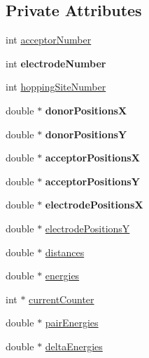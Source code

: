 \subsection*{Private Attributes}
\begin{DoxyCompactItemize}
\item 
int \hyperlink{classSystem_a1537030f9695aa1ec4184cd5669c73c3}{acceptor\+Number}
\item 
\mbox{\label{classSystem_a12c3b3c11046ab5d78b8805b72fae470}} 
int {\bfseries electrode\+Number}
\item 
int \hyperlink{classSystem_abace9493421abf20f1ae9502963a9b5d}{hopping\+Site\+Number}
\item 
\mbox{\label{classSystem_aa8a48bb1ca893cd2835daf8c0c9ecb31}} 
double $\ast$ {\bfseries donor\+PositionsX}
\item 
\mbox{\label{classSystem_ab4c8bb2714bac75e32ed8c96110059db}} 
double $\ast$ {\bfseries donor\+PositionsY}
\item 
\mbox{\label{classSystem_a36edfe2e62188f33cd8a5176e86da7ee}} 
double $\ast$ {\bfseries acceptor\+PositionsX}
\item 
\mbox{\label{classSystem_af1f617f7f8675673bbc672dd14738882}} 
double $\ast$ {\bfseries acceptor\+PositionsY}
\item 
\mbox{\label{classSystem_a15808f18033c796219fe010534d8e8df}} 
double $\ast$ {\bfseries electrode\+PositionsX}
\item 
double $\ast$ \hyperlink{classSystem_a19886677a5c1f1989fee3a9d1d4b4c80}{electrode\+PositionsY}
\item 
double $\ast$ \hyperlink{classSystem_a682a961342b2200c748da544fb84488a}{distances}
\item 
double $\ast$ \hyperlink{classSystem_aee5f3f70dcfa30875997d09e2a077dce}{energies}
\item 
int $\ast$ \hyperlink{classSystem_a8d4858c73f66a84785384ff1fb741e7e}{current\+Counter}
\item 
double $\ast$ \hyperlink{classSystem_acbe0d31bddfc490ec048dfaca2df2558}{pair\+Energies}
\item 
double $\ast$ \hyperlink{classSystem_aef68ee60ffd49b2beafde87dcf4a4fe3}{delta\+Energies}
\item 

\end{DoxyCompactItemize}
